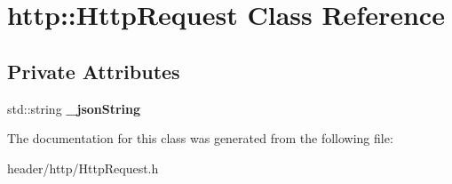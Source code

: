 \hypertarget{classhttp_1_1_http_request}{}\section{http\+:\+:Http\+Request Class Reference}
\label{classhttp_1_1_http_request}
\subsection*{Private Attributes}
\begin{DoxyCompactItemize}
\item 
\mbox{\label{classhttp_1_1_http_request_a765f1ae5d1b14982169f3d7c2499f448}} 
std\+::string {\bfseries \+\_\+json\+String}
\end{DoxyCompactItemize}


The documentation for this class was generated from the following file\+:\begin{DoxyCompactItemize}
\item 
header/http/Http\+Request.\+h\end{DoxyCompactItemize}
